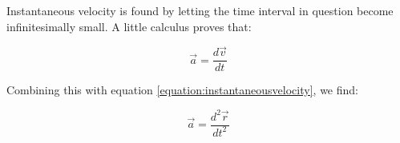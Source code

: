Instantaneous velocity is found by letting the time interval in question become infinitesimally small.  A little calculus proves that:
\begin{mdframed}[backgroundcolor=orange!20!white]
	\begin{equation}
	\vec{a} = \frac{d \vec{v}}{dt} 
	\end{equation}
\end{mdframed}

Combining this with equation \ref{equation:instantaneousvelocity}, we find:
\begin{mdframed}[backgroundcolor=orange!20!white]
	\begin{equation}
	\vec{a} = \frac{d^2 \vec{r}}{dt^2} 
	\end{equation}
\end{mdframed}


